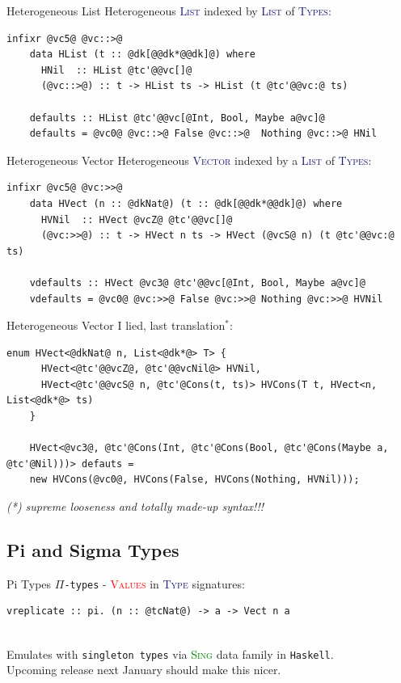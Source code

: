 \documentclass[xcolor={usenames,dvipsnames}]{beamer}
\newcommand{\htycon}[1]{\textcolor{MidnightBlue}{\textsc{#1}}}
\newcommand{\hvalcon}[1]{\textcolor{Red}{\textsc{#1}}}
\newcommand{\htyfam}[1]{\textcolor{Green}{\textsc{#1}}}
\begin{document}
\begin{frame}[fragile]{Heterogeneous List}
  Heterogeneous \htycon{List} indexed by \htycon{List} of \htycon{Types}:
  \begin{lstlisting}[style=hask]
    infixr @vc5@ @vc::>@
    data HList (t :: @dk[@@dk*@@dk]@) where
      HNil  :: HList @tc'@@vc[]@
      (@vc::>@) :: t -> HList ts -> HList (t @tc'@@vc:@ ts)

    defaults :: HList @tc'@@vc[@Int, Bool, Maybe a@vc]@
    defaults = @vc0@ @vc::>@ False @vc::>@  Nothing @vc::>@ HNil
  \end{lstlisting}
\end{frame}

\begin{frame}[fragile]{Heterogeneous Vector}
  Heterogeneous \htycon{Vector} indexed by a \htycon{List} of \htycon{Types}:
  \begin{lstlisting}[style=hask]
    infixr @vc5@ @vc:>>@
    data HVect (n :: @dkNat@) (t :: @dk[@@dk*@@dk]@) where
      HVNil  :: HVect @vcZ@ @tc'@@vc[]@
      (@vc:>>@) :: t -> HVect n ts -> HVect (@vcS@ n) (t @tc'@@vc:@ ts)

    vdefaults :: HVect @vc3@ @tc'@@vc[@Int, Bool, Maybe a@vc]@
    vdefaults = @vc0@ @vc:>>@ False @vc:>>@ Nothing @vc:>>@ HVNil
  \end{lstlisting}
\end{frame}

\begin{frame}[fragile]{Heterogeneous Vector}
  I lied, last translation$^*$:
  \begin{lstlisting}[style=hask]
    enum HVect<@dkNat@ n, List<@dk*@> T> {
      HVect<@tc'@@vcZ@, @tc'@@vcNil@> HVNil,
      HVect<@tc'@@vcS@ n, @tc'@Cons(t, ts)> HVCons(T t, HVect<n, List<@dk*@> ts)
    }

    HVect<@vc3@, @tc'@Cons(Int, @tc'@Cons(Bool, @tc'@Cons(Maybe a, @tc'@Nil)))> defauts =
    new HVCons(@vc0@, HVCons(False, HVCons(Nothing, HVNil)));
  \end{lstlisting}
  \textit{\tiny{(*) supreme looseness and totally made-up syntax!!!}}
\end{frame}


\subsection{Pi and Sigma Types}

\begin{frame}[fragile]{Pi Types}
  \texttt{$\Pi$-types} - \hvalcon{Values} in \htycon{Type} signatures:
  \begin{lstlisting}[style=hask]
    vreplicate :: pi. (n :: @tcNat@) -> a -> Vect n a
  \end{lstlisting}

  \ \\
  \pause
  Emulates with \texttt{singleton types} via \htyfam{Sing} data family in \texttt{Haskell}.\\
  Upcoming release next January should make this nicer.
\end{frame}
\end{document}
